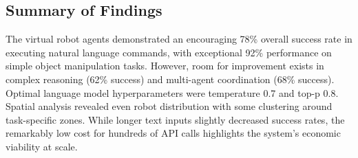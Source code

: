 \documentclass[pdflatex,sn-mathphys-num]{sn-jnl}%
\theoremstyle{thmstyleone}%
\theoremstyle{thmstyletwo}%
\theoremstyle{thmstylethree}%
\begin{document}
\subsection{Summary of Findings}
The virtual robot agents demonstrated an encouraging 78\% overall success rate in executing natural language commands, with exceptional 92\% performance on simple object manipulation tasks. However, room for improvement exists in complex reasoning (62\% success) and multi-agent coordination (68\% success). Optimal language model hyperparameters were temperature 0.7 and top-p 0.8. Spatial analysis revealed even robot distribution with some clustering around task-specific zones. While longer text inputs slightly decreased success rates, the remarkably low cost for hundreds of API calls highlights the system's economic viability at scale.


\end{document}
